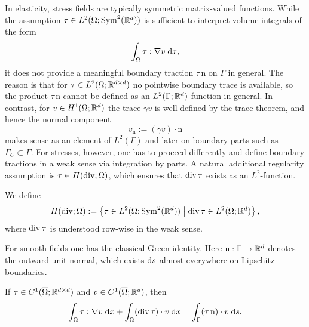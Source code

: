 In elasticity, stress fields are typically symmetric matrix-valued functions. While the assumption $\tau\in L^2(\Omega;\mathrm{Sym}^2({\mathbb R}^d))$ is sufficient to interpret volume integrals of the form
\begin{equation*}
	\int_\Omega \tau:\nabla v\;{{\mathrm{d}} x},
\end{equation*}
it does not provide a meaningful boundary traction $\tau\,\mathrm n$ on $\Gamma$ in general. The reason is that for $\tau\in L^2(\Omega;{\mathbb R}^{d\times d})$ no pointwise boundary trace is available, so the product $\tau\,\mathrm n$ cannot be defined as an $L^2(\Gamma;{\mathbb R}^d)$-function in general. In contrast, for $v\in H^1(\Omega;{\mathbb R}^d)$ the trace $\gamma v$ is well-defined by the trace theorem, and hence the normal component
\begin{equation*}
	v_{\mathrm n}:=(\gamma v)\cdot \mathrm n
\end{equation*}
makes sense as an element of $L^2(\Gamma)$ and later on boundary parts such as $\Gamma_C\subset\Gamma$. For stresses, however, one has to proceed differently and define boundary tractions in a weak sense via integration by parts. A natural additional regularity assumption is $\tau\in H(\diver;\Omega)$, which ensures that $\diver\tau$ exists as an $L^2$-function.

\begin{definition}\label{def:Hdiv}
	We define
	\begin{equation*}
		H(\diver;\Omega)
		:=
		\left\{\tau\in L^2(\Omega;\mathrm{Sym}^2(\R^d))\;\middle|\;\diver\tau\in L^2(\Omega;\R^d)\right\},
	\end{equation*}
	where $\diver\tau$ is understood row-wise in the weak sense.
\end{definition}

For smooth fields one has the classical Green identity. Here $\mathrm n:\Gamma\to{\mathbb R}^d$ denotes the outward unit normal, which exists ${{\mathrm{d}} s}$-almost everywhere on Lipschitz boundaries.

\begin{proposition}\label{pr:green_smooth}
	If $\tau\in C^1(\overline{\Omega};{\mathbb R}^{d\times d})$ and $v\in C^1(\overline{\Omega};{\mathbb R}^d)$, then
	\begin{equation}\label{eq:green_smooth}
		\int_\Omega \tau:\nabla v\;\dx + \int_\Omega (\diver\tau)\cdot v\;\dx
		= \int_\Gamma (\tau\,\mathrm{n})\cdot v\;\ds.
	\end{equation}
\end{proposition}

